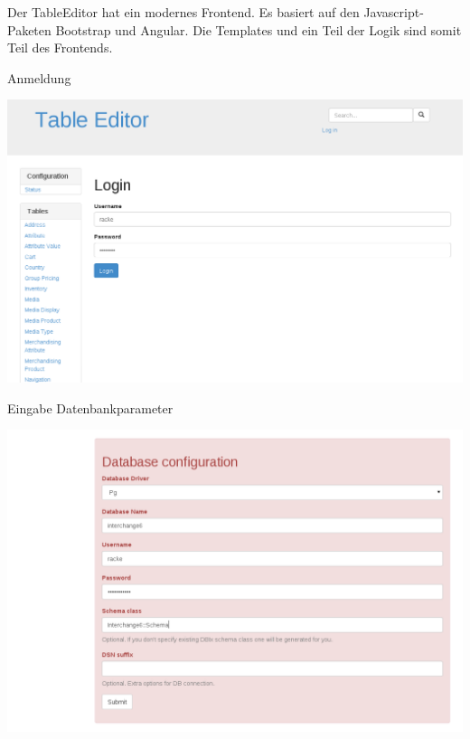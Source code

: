 Der TableEditor hat ein modernes Frontend. Es basiert
auf den Javascript-Paketen Bootstrap und Angular.
Die Templates und ein Teil der Logik sind somit Teil
des Frontends.

\begin{frame}{Anmeldung}
  \begin{center}
    \includegraphics[width=\textwidth,height=0.8\textheight,keepaspectratio]{images/login.png}
  \end{center}
\end{frame}

\begin{frame}{Eingabe Datenbankparameter}
  \begin{center}
    \includegraphics[width=\textwidth,height=0.8\textheight,keepaspectratio]{images/input.png}
  \end{center}
\end{frame}

